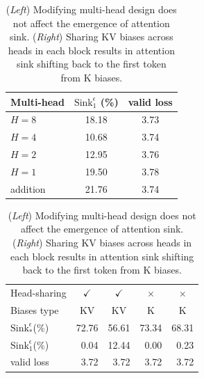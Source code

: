 \begin{table}[htbp]
\caption{(\emph{Left}) Modifying multi-head design does not affect the emergence of attention sink. (\emph{Right}) Sharing KV biases across heads in each block results in attention sink shifting back to the first token from K biases.}
\begin{minipage}[t]{0.4\linewidth}
\begin{center}
\begin{tabular}[t]{l|cc}
\toprule
Multi-head & $\textrm{Sink}_1^{\epsilon}$ (\%) & valid loss \\
\midrule
$H=\textrm{8}$ & 18.18 & 3.73\\
$H=\textrm{4}$ & 10.68 & 3.74\\
$H=\textrm{2}$ & 12.95 & 3.76\\
$H=\textrm{1}$ & 19.50 & 3.78\\
addition & 21.76 & 3.74\\
\bottomrule
\end{tabular}
\end{center}
\end{minipage}
\hfill
\begin{minipage}[t]{0.58\linewidth}
\begin{center}
\begin{tabular}[t]{l|cccc}
\toprule
Head-sharing & $\checkmark$ & $\checkmark$  & $\times$ & $\times$ \\
Biases type & KV & KV & K & K \\
\midrule
$\textrm{Sink}_{*}^{\epsilon}$(\%)  & 72.76 & 56.61 & 73.34 & 68.31  \\
$\textrm{Sink}_1^{\epsilon}$(\%) &   \,\,\,0.04 & 12.44 & \,\,\,0.00 & \,\,\,0.23 \\
valid loss & \,\,\,3.72 & \,\,\,3.72 & \,\,\,3.72 & \,\,\,3.72\\
\bottomrule
\end{tabular}
\end{center}
\end{minipage}
\label{multi_head}
\end{table}

